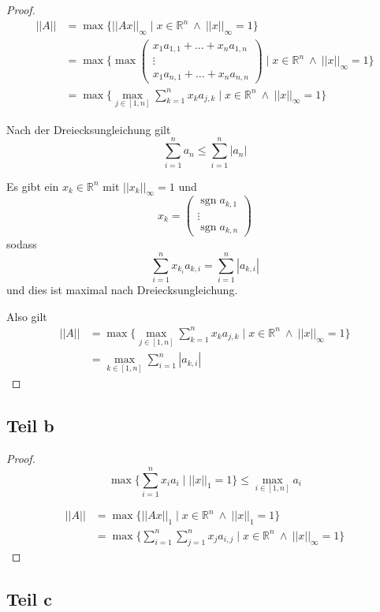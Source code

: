 \documentclass[10pt,a4paper]{article}
\DeclareMathOperator{\sgn}{sgn}
\begin{document}
\begin{proof}
\begin{align*}
||A|| & = \max \{ ||Ax||_{\infty} \mid x \in \mathbb{R}^{n}\ \land\ ||x||_{\infty} = 1 \}\\
& = \max \{ \max \begin{pmatrix}
x_{1}a_{1, 1} + \dots + x_{n}a_{1, n}\\
\vdots\\
x_{1}a_{n, 1} + \dots + x_{n}a_{n, n}
\end{pmatrix} \mid x \in \mathbb{R}^{n}\ \land\ ||x||_{\infty} = 1 \}\\
& = \max \{ \max_{j \in [1, n]} \sum_{k = 1}^{n} x_{k}a_{j, k} \mid x \in \mathbb{R}^{n}\ \land\ ||x||_{\infty} = 1 \}
\end{align*}

Nach der Dreiecksungleichung gilt
\begin{equation}
\sum_{i = 1}^{n} a_{n} \le \sum_{i = 1}^{n} |a_{n}|
\end{equation}

Es gibt ein $x_{k} \in \mathbb{R}^{n}$ mit $||x_{k}||_{\infty} = 1$ und
\begin{equation}
x_{k} = \begin{pmatrix}
\sgn a_{k, 1}\\
\vdots\\
\sgn a_{k, n}
\end{pmatrix}
\end{equation}
sodass
\begin{equation}
\sum_{i = 1}^{n} x_{k_{i}}a_{k, i} = \sum_{i = 1}^{n} |a_{k, i}|
\end{equation}
und dies ist maximal nach Dreiecksungleichung.

Also gilt
\begin{align*}
||A|| & = \max \{ \max_{j \in [1, n]} \sum_{k = 1}^{n} x_{k}a_{j, k} \mid x \in \mathbb{R}^{n}\ \land\ ||x||_{\infty} = 1 \}\\
& = \max_{k \in [1, n]} \sum_{i = 1}^{n} |a_{k, i}|
\end{align*}
\end{proof}

\subsection*{Teil b}

\begin{proof}
\begin{equation}
\max \{ \sum_{i = 1}^{n} x_{i}a_{i} \mid ||x||_{1} = 1 \} \le \max_{i \in [1, n]} a_{i}
\end{equation}

\begin{align*}
||A|| & = \max \{ ||Ax||_{1} \mid x \in \mathbb{R}^{n}\ \land\ ||x||_{1} = 1 \}\\
& = \max \{ \sum_{i = 1}^{n} \sum_{j = 1}^{n} x_{j}a_{i, j} \mid x \in \mathbb{R}^{n}\ \land\ ||x||_{\infty} = 1 \}
\end{align*}
\end{proof}

\subsection*{Teil c}
\end{document}
